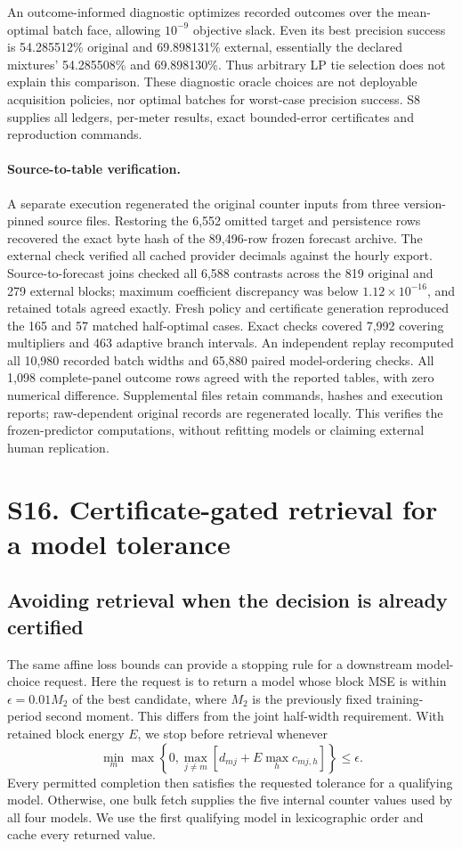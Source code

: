 An outcome-informed diagnostic optimizes recorded outcomes over the
mean-optimal batch face, allowing $10^{-9}$ objective slack. Even its best
precision success is 54.285512\% original and 69.898131\% external,
essentially the declared mixtures' 54.285508\% and 69.898130\%.
Thus arbitrary LP tie selection does not explain this comparison. These
diagnostic oracle choices are not deployable acquisition policies, nor
optimal batches for worst-case precision success. S8 supplies all ledgers,
per-meter results, exact bounded-error certificates and reproduction commands.
\paragraph{Source-to-table verification.}
A separate execution regenerated the original counter inputs from three
version-pinned source files. Restoring the 6,552 omitted target and persistence
rows recovered the exact byte hash of the 89,496-row frozen forecast archive.
The external check verified all cached provider decimals against the hourly
export. Source-to-forecast joins checked all 6,588 contrasts across the
819 original and 279 external blocks; maximum coefficient discrepancy was below
$1.12\times10^{-16}$, and retained totals agreed exactly.
Fresh policy and certificate generation reproduced the 165 and 57 matched
half-optimal cases. Exact checks covered 7,992 covering multipliers and
463 adaptive branch intervals. An independent replay recomputed all 10,980
recorded batch widths and 65,880 paired model-ordering checks. All 1,098
complete-panel outcome rows agreed with the reported tables, with zero
numerical difference. Supplemental files retain commands, hashes and
execution reports; raw-dependent original records are regenerated locally.
This verifies the frozen-predictor computations, without refitting models
or claiming external human replication.
\section{S16. Certificate-gated retrieval for a model tolerance}
\subsection{Avoiding retrieval when the decision is already certified}
\label{sec:retrieval-gate}
The same affine loss bounds can provide a stopping rule for a downstream
model-choice request. Here the request is to return a model whose block MSE is
within $\epsilon=0.01M_2$ of the best candidate, where $M_2$ is the previously
fixed training-period second moment. This differs from the joint half-width
requirement. With retained block energy $E$, we stop before retrieval whenever
\[
 \min_m\max\left\{0,\max_{j\ne m}
 \left[d_{mj}+E\max_h c_{mj,h}\right]\right\}\leq\epsilon.
\]
Every permitted completion then satisfies the requested tolerance for a
qualifying model. Otherwise, one bulk fetch supplies the five internal counter
values used by all four models. We use the first qualifying model in
lexicographic order and cache every returned value.

